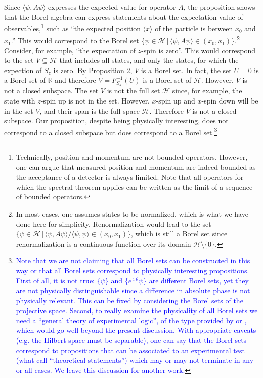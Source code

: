 \documentclass[11pt, executivepaper]{article}
\begin{document}
Since $\langle \psi , A \psi \rangle$ expresses the expected value for operator $A$, the proposition shows that the Borel algebra can express statements about the expectation value of observables,\footnote{Technically, position and momentum are not bounded operators. However, one can argue that measured position and momentum are indeed bounded as the acceptance of a detector is always limited. Note that all operators for which the spectral theorem applies can be written as the limit of a sequence of bounded operators.} such as ``the expected position $\langle x \rangle$ of the particle is between $x_0$ and $x_1$.'' This would correspond to the Borel set $\{ \psi \in \mathcal{H} \, | \, \langle \psi , A \psi \rangle \in (x_0, x_1) \}$.\footnote{In most cases, one assumes states to be normalized, which is what we have done here for simplicity. Renormalization would lead to the set $\{ \psi \in \mathcal{H} \, | \, \langle \psi , A \psi \rangle / \langle \psi , \psi \rangle \in (x_0, x_1) \}$, which is still a Borel set since renormalization is a continuous function over its domain $\mathcal{H} \setminus \{ 0 \}$.} Consider, for example, ``the expectation of $z$-spin is zero''. This would correspond to the set $V \subseteq \mathcal{H}$ that includes all states, and only the states, for which the expection of $S_z$ is zero. By Proposition 2, $V$ is a Borel set. In fact, the set $U = {0}$ is a Borel set of $\mathbb{R}$ and therefore $V = F_{S_z}^{-1}(U)$ is a Borel set of $\mathcal{H}$. However, $V$ is not a closed subspace. The set $V$ is not the full set $\mathcal{H}$ since, for example, the state with $z$-spin up is not in the set. However, $x$-spin up and $x$-spin down will be in the set $V$, and their span is the full space $\mathcal{H}$. Therefore $V$ is not a closed subspace. Our proposition, despite being physically interesting, does not correspond to a closed subspace but does correspond to a Borel set.\footnote{\textcolor{blue}{Note that we are not claiming that all Borel sets can be constructed in this way or that all Borel sets correspond to physically interesting propositions. First of all, it is not true: $\{ \psi \}$ and $\{ e^{\imath \theta} \psi\}$ are different Borel sets, yet they are not physically distinguishable since a difference in absolute phase is not physically relevant. This can be fixed by considering the Borel sets of the projective space. Second, to really examine the physicality of all Borel sets we need a ``general theory of experimental logic'', of the type provided by \cite{Kelly:1996} or \cite{Carcassi:2021}, which would go well beyond the present discussion. With appropriate caveats (e.g. the Hilbert space must be separable), one can say that the Borel sets correspond to propositions that can be associated to an experimental test (what \cite{Carcassi:2021} call ``theoretical statements'') which may or may not terminate in any or all cases. We leave this discussion for another work.}}
\end{document}
